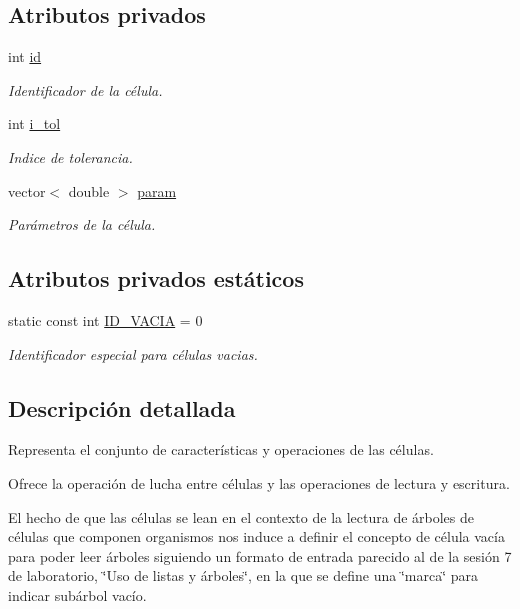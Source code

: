 \subsection*{\-Atributos privados}
\begin{DoxyCompactItemize}
\item 
int \hyperlink{class_celula_a0984a8b3deeed4979ed6f6141edc3c0c}{id}
\begin{DoxyCompactList}\small\item\em \-Identificador de la célula. \end{DoxyCompactList}\item 
int \hyperlink{class_celula_abda46be7b30a13909d9819c46238080b}{i\-\_\-tol}
\begin{DoxyCompactList}\small\item\em \-Indice de tolerancia. \end{DoxyCompactList}\item 
vector$<$ double $>$ \hyperlink{class_celula_a386c6da3af12b5662e3866675d60a4b7}{param}
\begin{DoxyCompactList}\small\item\em \-Parámetros de la célula. \end{DoxyCompactList}\end{DoxyCompactItemize}
\subsection*{\-Atributos privados estáticos}
\begin{DoxyCompactItemize}
\item 
static const int \hyperlink{class_celula_affff67b41ead0b1f3a3f4faad6c049ac}{\-I\-D\-\_\-\-V\-A\-C\-I\-A} = 0
\begin{DoxyCompactList}\small\item\em \-Identificador especial para células vacias. \end{DoxyCompactList}\end{DoxyCompactItemize}


\subsection{\-Descripción detallada}
\-Representa el conjunto de características y operaciones de las células. 

\-Ofrece la operación de lucha entre células y las operaciones de lectura y escritura.

\-El hecho de que las células se lean en el contexto de la lectura de árboles de células que componen organismos nos induce a definir el concepto de célula vacía para poder leer árboles siguiendo un formato de entrada parecido al de la sesión 7 de laboratorio, \char`\"{}\-Uso
    de listas y árboles\char`\"{}, en la que se define una \char`\"{}marca\char`\"{} para indicar subárbol vacío. 

